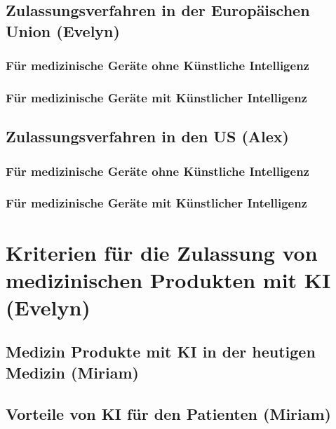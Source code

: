 \documentclass[a4paper, 11pt]{article}
\begin{document}
		\subsection{Zulassungsverfahren in der Europäischen Union \small{(Evelyn)}}\label{sec:europe}
			
			\subsubsection{Für medizinische Geräte ohne Künstliche Intelligenz}\label{sec:europe-no-ai}
				
			\subsubsection{Für medizinische Geräte mit Künstlicher Intelligenz}\label{sec:europe-with-ai}
				
		\subsection{Zulassungsverfahren in den US \small{(Alex)}}\label{sec:us}
			
			\subsubsection{Für medizinische Geräte ohne Künstliche Intelligenz}\label{sec:us-no-ai}
				
			\subsubsection{Für medizinische Geräte mit Künstlicher Intelligenz}\label{sec:us-with-ai}
				

	\newpage
	\section{Kriterien für die Zulassung von medizinischen Produkten mit KI  \small{(Evelyn)}}\label{sec:analysis}

				
			\subsection{Medizin Produkte mit KI in der heutigen Medizin \small{(Miriam)}}\label{sec:ki-today}
				
			\subsection{Vorteile von KI für den Patienten \small{(Miriam)}}\label{sec:ki-advantages}
				
\end{document}
